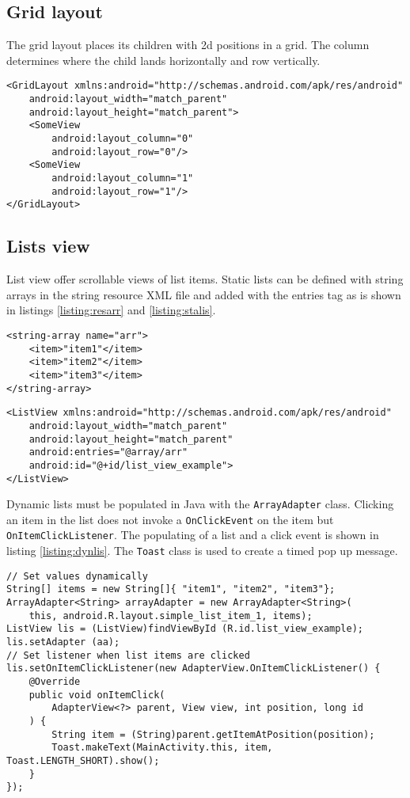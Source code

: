 \subsection{Grid layout}
The grid layout places its children with 2d positions in a grid. The column determines where the child lands horizontally and row vertically.
\begin{lstlisting}[style=A_XML, caption={Grid layout declaration}, label = {listing:gridlay}]
<GridLayout xmlns:android="http://schemas.android.com/apk/res/android"
    android:layout_width="match_parent"
    android:layout_height="match_parent">
    <SomeView
        android:layout_column="0"
        android:layout_row="0"/>
    <SomeView
        android:layout_column="1"
        android:layout_row="1"/>
</GridLayout>
\end{lstlisting}

\subsection{Lists view}
List view offer scrollable views of list items. Static lists can be defined with string arrays in the string resource XML file and added with the entries tag as is shown in listings \ref{listing:resarr} and \ref{listing:stalis}.
\begin{lstlisting}[style=A_XML, caption={Resource string array}, label = {listing:resarr}]
<string-array name="arr">
    <item>"item1"</item>
    <item>"item2"</item>
    <item>"item3"</item>
</string-array>
\end{lstlisting}
\begin{lstlisting}[style=A_XML, caption={Static list}, label = {listing:stalis}]
<ListView xmlns:android="http://schemas.android.com/apk/res/android"
    android:layout_width="match_parent"
    android:layout_height="match_parent"
    android:entries="@array/arr"
    android:id="@+id/list_view_example">
</ListView>
\end{lstlisting}

Dynamic lists must be populated in Java with the \texttt{ArrayAdapter} class. Clicking an item in the list does not invoke a \texttt{OnClickEvent} on the item but \texttt{OnItemClickListener}. The populating of a list and a click event is shown in listing \ref{listing:dynlis}. The \texttt{Toast} class is used to create a timed pop up message.

\begin{lstlisting}[style=A_Java, caption={Dynamic list}, label = {listing:dynlis}]
// Set values dynamically
String[] items = new String[]{ "item1", "item2", "item3"};
ArrayAdapter<String> arrayAdapter = new ArrayAdapter<String>(
    this, android.R.layout.simple_list_item_1, items);
ListView lis = (ListView)findViewById (R.id.list_view_example);
lis.setAdapter (aa);
// Set listener when list items are clicked
lis.setOnItemClickListener(new AdapterView.OnItemClickListener() {
    @Override
    public void onItemClick(
        AdapterView<?> parent, View view, int position, long id
    ) {
        String item = (String)parent.getItemAtPosition(position);
        Toast.makeText(MainActivity.this, item, Toast.LENGTH_SHORT).show();
    }
});

\end{lstlisting}

